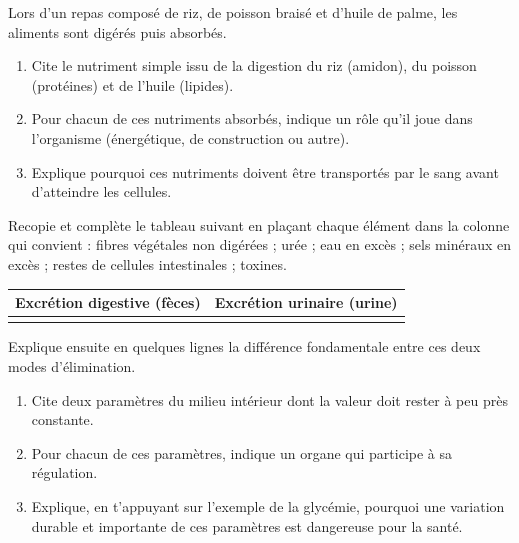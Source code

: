 \documentclass[11pt]{article}
\begin{document}
\begin{exercice}
Lors d'un repas composé de riz, de poisson braisé et d'huile de palme, les aliments sont digérés puis absorbés.
\begin{enumerate}
\item Cite le nutriment simple issu de la digestion du riz (amidon), du poisson (protéines) et de l'huile (lipides).
\item Pour chacun de ces nutriments absorbés, indique un rôle qu'il joue dans l'organisme (énergétique, de construction ou autre).
\item Explique pourquoi ces nutriments doivent être transportés par le sang avant d'atteindre les cellules.
\end{enumerate}
\end{exercice}

\begin{exercice}
Recopie et complète le tableau suivant en plaçant chaque élément dans la colonne qui convient : fibres végétales non digérées ; urée ; eau en excès ; sels minéraux en excès ; restes de cellules intestinales ; toxines.
\begin{center}
\begin{tabularx}{\linewidth}{|X|X|}
\hline
\rowcolor{popblueL} \textbf{Excrétion digestive (fèces)} & \textbf{Excrétion urinaire (urine)} \\
\hline
 & \\
\hline
\end{tabularx}
\end{center}
Explique ensuite en quelques lignes la différence fondamentale entre ces deux modes d'élimination.
\end{exercice}

\begin{exercice}
\begin{enumerate}
\item Cite deux paramètres du milieu intérieur dont la valeur doit rester à peu près constante.
\item Pour chacun de ces paramètres, indique un organe qui participe à sa régulation.
\item Explique, en t'appuyant sur l'exemple de la glycémie, pourquoi une variation durable et importante de ces paramètres est dangereuse pour la santé.
\end{enumerate}
\end{exercice}
\end{document}
